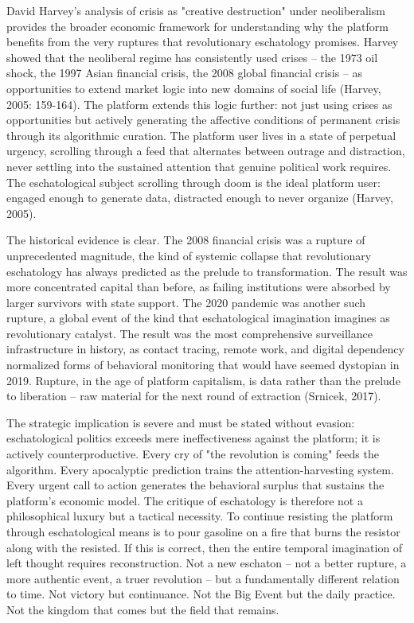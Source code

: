 David Harvey's analysis of crisis as "creative destruction" under neoliberalism provides the broader economic framework for understanding why the platform benefits from the very ruptures that revolutionary eschatology promises. Harvey showed that the neoliberal regime has consistently used crises -- the 1973 oil shock, the 1997 Asian financial crisis, the 2008 global financial crisis -- as opportunities to extend market logic into new domains of social life (Harvey, 2005: 159-164). The platform extends this logic further: not just using crises as opportunities but actively generating the affective conditions of permanent crisis through its algorithmic curation. The platform user lives in a state of perpetual urgency, scrolling through a feed that alternates between outrage and distraction, never settling into the sustained attention that genuine political work requires. The eschatological subject scrolling through doom is the ideal platform user: engaged enough to generate data, distracted enough to never organize (Harvey, 2005).

The historical evidence is clear. The 2008 financial crisis was a rupture of unprecedented magnitude, the kind of systemic collapse that revolutionary eschatology has always predicted as the prelude to transformation. The result was more concentrated capital than before, as failing institutions were absorbed by larger survivors with state support. The 2020 pandemic was another such rupture, a global event of the kind that eschatological imagination imagines as revolutionary catalyst. The result was the most comprehensive surveillance infrastructure in history, as contact tracing, remote work, and digital dependency normalized forms of behavioral monitoring that would have seemed dystopian in 2019. Rupture, in the age of platform capitalism, is data rather than the prelude to liberation -- raw material for the next round of extraction (Srnicek, 2017).

The strategic implication is severe and must be stated without evasion: eschatological politics exceeds mere ineffectiveness against the platform; it is actively counterproductive. Every cry of "the revolution is coming" feeds the algorithm. Every apocalyptic prediction trains the attention-harvesting system. Every urgent call to action generates the behavioral surplus that sustains the platform's economic model. The critique of eschatology is therefore not a philosophical luxury but a tactical necessity. To continue resisting the platform through eschatological means is to pour gasoline on a fire that burns the resistor along with the resisted. If this is correct, then the entire temporal imagination of left thought requires reconstruction. Not a new eschaton -- not a better rupture, a more authentic event, a truer revolution -- but a fundamentally different relation to time. Not victory but continuance. Not the Big Event but the daily practice. Not the kingdom that comes but the field that remains.

